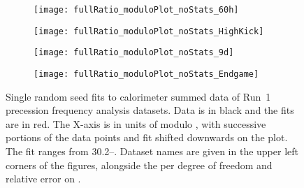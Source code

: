 \begin{figure}
\centering
    \begin{subfigure}[]{0.45\textwidth}
        \centering
        \texttt{[image: fullRatio\_moduloPlot\_noStats\_60h]}
    \end{subfigure}%
    \begin{subfigure}[]{0.45\textwidth}
        \centering
        \texttt{[image: fullRatio\_moduloPlot\_noStats\_HighKick]}
    \end{subfigure}
    \vspace{4mm}
    \begin{subfigure}[]{0.45\textwidth}
        \centering
        \texttt{[image: fullRatio\_moduloPlot\_noStats\_9d]}
    \end{subfigure}%
    \begin{subfigure}[]{0.45\textwidth}
        \centering
        \texttt{[image: fullRatio\_moduloPlot\_noStats\_Endgame]}
    \end{subfigure}
\caption[Single random seed fits to calorimeter summed data of Run~1 precession frequency analysis datasets]{Single random seed fits to calorimeter summed data of Run~1 precession frequency analysis datasets. Data is in black and the fits are in red. The X-axis is in units of \mus{} modulo , with successive portions of the data points and fit shifted downwards on the plot. The fit ranges from 30.2--. Dataset names are given in the upper left corners of the figures, alongside the \chisq per degree of freedom and relative error on \wa.}
\label{fig:moduloPlots}
\end{figure}



